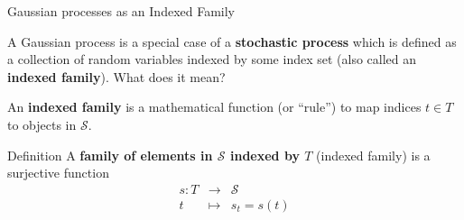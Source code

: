 \begin{vbframe}{Gaussian processes as an Indexed Family}



A Gaussian process is a special case of a \textbf{stochastic process} which is defined as a collection of random variables indexed by some index set (also called an \textbf{indexed family}). What does it mean? 

\lz 

An \textbf{indexed family} is a mathematical function (or \enquote{rule}) to map indices $t \in T$ to objects in $\mathcal{S}$. 

\begin{block}{Definition}
A \textbf{family of elements in $\mathcal{S}$ indexed by $T$} (indexed family) is a surjective function 
\vspace*{-0.3cm}
\begin{eqnarray*}
s: T &\to& \mathcal{S} \\
   t &\mapsto& s_t = s(t) 
\end{eqnarray*}
\end{block}

\end{vbframe}

